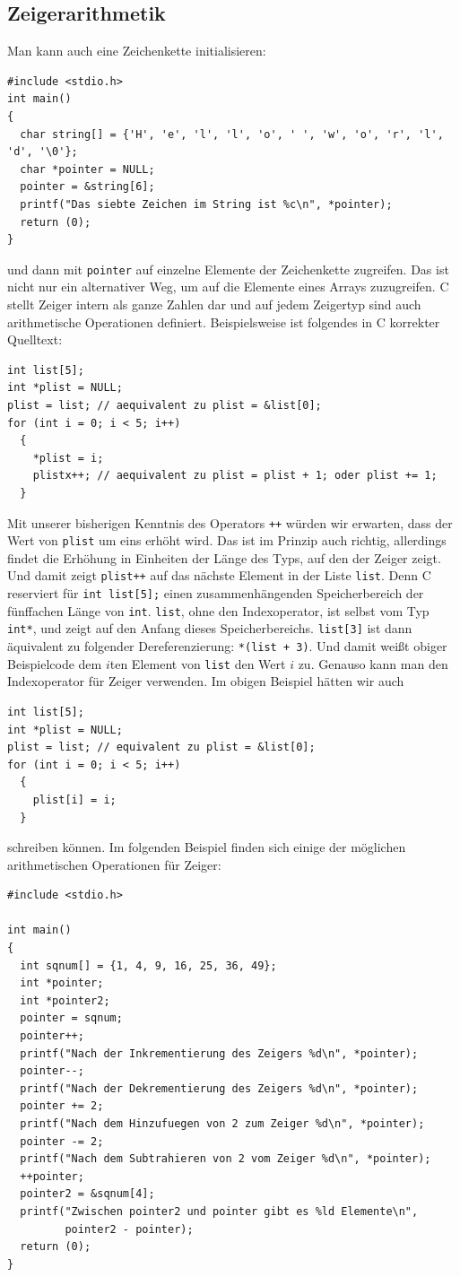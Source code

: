 \subsection{Zeigerarithmetik}

Man kann auch eine Zeichenkette initialisieren:
\begin{lstlisting}
#include <stdio.h>
int main()
{
  char string[] = {'H', 'e', 'l', 'l', 'o', ' ', 'w', 'o', 'r', 'l', 'd', '\0'};
  char *pointer = NULL;
  pointer = &string[6];
  printf("Das siebte Zeichen im String ist %c\n", *pointer);
  return (0);
}
\end{lstlisting}
und dann mit \verb|pointer| auf einzelne Elemente der Zeichenkette zugreifen.
Das ist nicht nur ein alternativer Weg, um auf die Elemente eines Arrays zuzugreifen.
C stellt Zeiger intern als ganze Zahlen dar und auf jedem Zeigertyp sind auch arithmetische Operationen definiert.
Beispielsweise ist folgendes in C korrekter Quelltext:
\begin{lstlisting}
int list[5];
int *plist = NULL;
plist = list; // aequivalent zu plist = &list[0];
for (int i = 0; i < 5; i++)
  {
    *plist = i;
    plistx++; // aequivalent zu plist = plist + 1; oder plist += 1;
  }
\end{lstlisting}
Mit unserer bisherigen Kenntnis des Operators \verb|++| würden wir erwarten, dass der Wert von \verb|plist| um eins erhöht wird.
Das ist im Prinzip auch richtig, allerdings findet die Erhöhung in Einheiten der Länge des Typs, auf den der Zeiger zeigt.
Und damit zeigt \verb|plist++| auf das nächste Element in der Liste \verb|list|.
Denn C reserviert für \verb|int list[5];| einen zusammenhängenden Speicherbereich der fünffachen Länge von \verb|int|.
\verb|list|, ohne den Indexoperator, ist selbst vom Typ \verb|int*|, und zeigt auf den Anfang dieses Speicherbereichs.
\verb|list[3]| ist dann äquivalent zu folgender Dereferenzierung: \verb|*(list + 3)|.
Und damit weißt obiger Beispielcode dem $i$ten Element von \verb|list| den Wert $i$ zu.
Genauso kann man den Indexoperator für Zeiger verwenden.
Im obigen Beispiel hätten wir auch
\begin{lstlisting}
int list[5];
int *plist = NULL;
plist = list; // equivalent zu plist = &list[0];
for (int i = 0; i < 5; i++)
  {
    plist[i] = i;
  }
\end{lstlisting}
schreiben können.
Im folgenden Beispiel finden sich einige der möglichen arithmetischen Operationen für Zeiger:
\begin{lstlisting}
#include <stdio.h>

int main()
{
  int sqnum[] = {1, 4, 9, 16, 25, 36, 49};
  int *pointer;
  int *pointer2;
  pointer = sqnum;
  pointer++;
  printf("Nach der Inkrementierung des Zeigers %d\n", *pointer);
  pointer--;
  printf("Nach der Dekrementierung des Zeigers %d\n", *pointer);
  pointer += 2;
  printf("Nach dem Hinzufuegen von 2 zum Zeiger %d\n", *pointer);
  pointer -= 2;
  printf("Nach dem Subtrahieren von 2 vom Zeiger %d\n", *pointer);
  ++pointer;
  pointer2 = &sqnum[4];
  printf("Zwischen pointer2 und pointer gibt es %ld Elemente\n",
         pointer2 - pointer);
  return (0);
}
\end{lstlisting}
